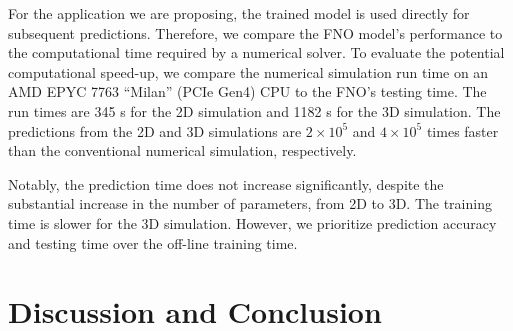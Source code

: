 \documentclass[draft]{agujournal2019}
\begin{document}
For the application we are proposing, the trained model is used directly for subsequent predictions. Therefore, we compare the FNO model's performance to the computational time required by a numerical solver. To evaluate the potential computational speed-up, we compare the numerical simulation run time on an AMD EPYC 7763 “Milan” (PCIe Gen4) CPU to the FNO's testing time. The run times are 345 s for the 2D simulation and 1182 s for the 3D simulation. The predictions from the 2D and 3D simulations are $2 \times 10^{5}$ and $4 \times 10^{5}$ times faster than the conventional numerical simulation, respectively.

Notably, the prediction time does not increase significantly, despite the substantial increase in the number of parameters, from 2D to 3D. The training time is slower for the 3D simulation. However, we prioritize prediction accuracy and testing time over the off-line training time.

\begin{table}
\caption{Comparison of different models in terms of parameters, training time, testing performance, and speed-up. The testing times are calculated by taking the median of 100 random cases. The speed-up is compared with numerical simulation run time of 345 s for 2D and 1182 s for 3D.}
    \centering
    \label{tab:model_comparison}
\end{table}


\section{Discussion and Conclusion}
\label{sec:discussion}
\end{document}
